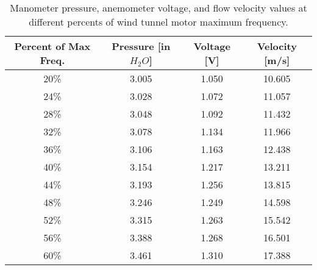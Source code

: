 \begin{table}[htpb]
    \caption{Manometer pressure, anemometer voltage, and flow velocity values at different percents of wind tunnel motor maximum frequency.}
    \label{tab:Calibration_data}
    \centering
    \begin{tabular}{cccc}
        \toprule
        Percent of Max Freq. & Pressure [in $H_2O$] & Voltage [\unit{\volt}] & Velocity [\unit{\meter/\second}]\\
        \midrule
        \num{20}\% & \num{3.005} & \num{1.050} & \num{10.605} \\
        \num{24}\% & \num{3.028} & \num{1.072} & \num{11.057} \\
        \num{28}\% & \num{3.048} & \num{1.092} & \num{11.432} \\
        \num{32}\% & \num{3.078} & \num{1.134} & \num{11.966} \\
        \num{36}\% & \num{3.106} & \num{1.163} & \num{12.438} \\
        \num{40}\% & \num{3.154} & \num{1.217} & \num{13.211} \\
        \num{44}\% & \num{3.193} & \num{1.256} & \num{13.815} \\
        \num{48}\% & \num{3.246} & \num{1.249} & \num{14.598} \\
        \num{52}\% & \num{3.315} & \num{1.263} & \num{15.542} \\
        \num{56}\% & \num{3.388} & \num{1.268} & \num{16.501} \\
        \num{60}\% & \num{3.461} & \num{1.310} & \num{17.388} \\
    \end{tabular} 
\end{table}